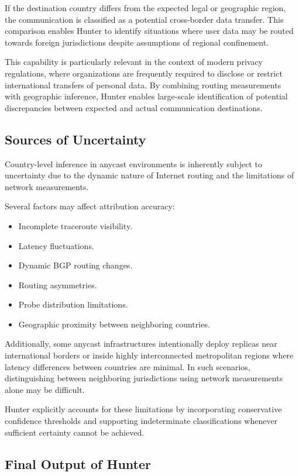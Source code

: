If the destination country differs from the expected legal or geographic region, the communication is classified as a potential cross-border data transfer. This comparison enables Hunter to identify situations where user data may be routed towards foreign jurisdictions despite assumptions of regional confinement.

This capability is particularly relevant in the context of modern privacy regulations, where organizations are frequently required to disclose or restrict international transfers of personal data. By combining routing measurements with geographic inference, Hunter enables large-scale identification of potential discrepancies between expected and actual communication destinations.

\subsection{Sources of Uncertainty}

Country-level inference in anycast environments is inherently subject to uncertainty due to the dynamic nature of Internet routing and the limitations of network measurements.

Several factors may affect attribution accuracy:

\begin{itemize}
    \item Incomplete traceroute visibility.
    \item Latency fluctuations.
    \item Dynamic BGP routing changes.
    \item Routing asymmetries.
    \item Probe distribution limitations.
    \item Geographic proximity between neighboring countries.
\end{itemize}

Additionally, some anycast infrastructures intentionally deploy replicas near international borders or inside highly interconnected metropolitan regions where latency differences between countries are minimal. In such scenarios, distinguishing between neighboring jurisdictions using network measurements alone may be difficult.

Hunter explicitly accounts for these limitations by incorporating conservative confidence thresholds and supporting indeterminate classifications whenever sufficient certainty cannot be achieved.

\subsection{Final Output of Hunter}

